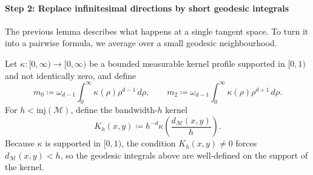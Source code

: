\documentclass[a4paper,11pt, DIV=10]{scrartcl}
\numberwithin{equation}{section}
\theoremstyle{definition}
\theoremstyle{remark}
\newcommand{\mc}[1]{\mathcal{#1}}
\begin{document}
\paragraph{Step 2: Replace infinitesimal directions by short geodesic integrals}
The previous lemma describes what happens at a single tangent space. To turn it into a pairwise formula, we average over a small geodesic neighbourhood.

Let $\kappa\colon [0,\infty)\to [0,\infty)$ be a bounded measurable kernel profile supported in $[0,1)$ and not identically zero, and define
\begin{equation}
m_0\coloneq \omega_{d-1}\int_0^\infty \kappa(\rho)\rho^{d-1}\,d\rho,
\qquad
m_2\coloneq \omega_{d-1}\int_0^\infty \kappa(\rho)\rho^{d+1}\,d\rho.
\end{equation}
For $h<\mathrm{inj}(\mc{M})$, define the bandwidth-$h$ kernel
\begin{equation}
K_h(x,y)\coloneq h^{-d}\kappa\!\left(\frac{d_{\mc{M}}(x,y)}{h}\right).
\end{equation}
Because $\kappa$ is supported in $[0,1)$, the condition $K_h(x,y)\neq 0$ forces $d_{\mc{M}}(x,y)<h$, so the geodesic integrals above are well-defined on the support of the kernel.
\end{document}
